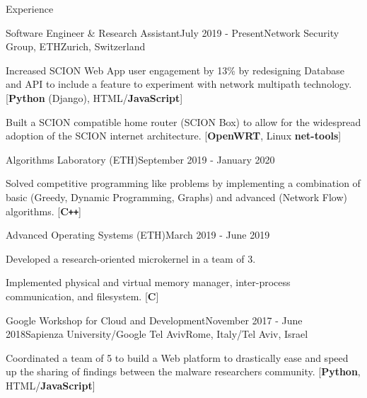 \documentclass{resume}
\begin{document}
\begin{rSection}{Experience}

  \begin{rSubsection}{Software Engineer \& Research Assistant}{July 2019 - Present}{Network Security Group, ETH}{Zurich, Switzerland}
  \item Increased SCION Web App user engagement by 13\% by redesigning Database and API to include a feature to experiment with network multipath technology.  [\textbf{Python} (Django), HTML/\textbf{JavaScript}]
  \item Built a SCION compatible home router (SCION Box) to allow for the widespread adoption of the SCION internet architecture. [\textbf{OpenWRT}, Linux \textbf{net-tools}]
  \end{rSubsection}
  \begin{rSubsection}{Algorithms Laboratory (ETH)}{September 2019 - January 2020}{}{}
  \item Solved competitive programming like problems by implementing a combination of basic (Greedy, Dynamic Programming, Graphs) and advanced (Network Flow) algorithms. [\textbf{C\texttt{++}}]
  \end{rSubsection}
  \begin{rSubsection}{Advanced Operating Systems (ETH)}{March 2019 - June 2019}{}{}
  \item Developed a research-oriented microkernel in a team of 3.
  \item Implemented physical and virtual memory manager, inter-process communication, and filesystem. [\textbf{C}]
  \end{rSubsection}
  \begin{rSubsection}{Google Workshop for Cloud and Development}{November 2017 - June 2018}{Sapienza University/Google Tel Aviv}{Rome, Italy/Tel Aviv, Israel}
  \item Coordinated a team of 5 to build a Web platform to drastically ease and speed up the sharing of findings between the malware researchers community. [\textbf{Python}, HTML/\textbf{JavaScript}]
  \end{rSubsection}

\end{rSection}

\end{document}

